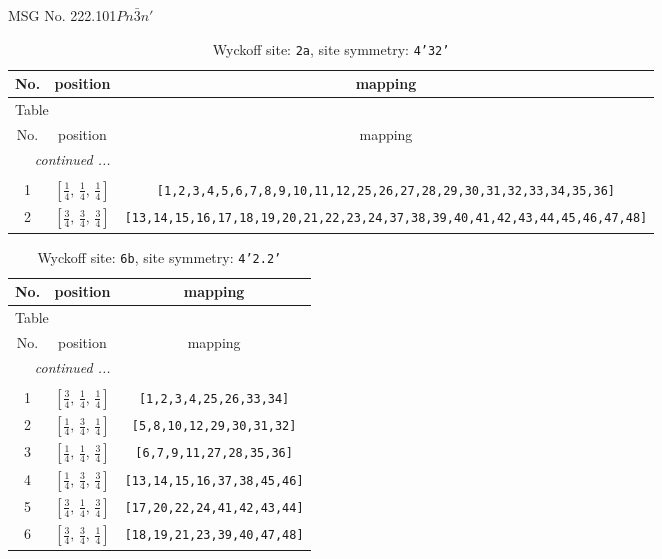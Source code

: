 \documentclass[fleqn,8pt]{jsarticle}
\begin{document}
\setcounter{MaxMatrixCols}{32}

\renewcommand{\tablename}{Table~}
\renewcommand{\figurename}{Figure~}
\begin{center}
\LARGE
MSG No. 222.101\quad$Pn\bar{3}n'$
\end{center}
\renewcommand{\arraystretch}{1.2}
\begin{longtable}{ccc}
\caption{Wyckoff site: {\tt 2a}, site symmetry: {\tt 4'32'}}
 \\
 \hline \hline
No. & position & mapping \\ \hline \endfirsthead

\multicolumn{2}{l}{\tablename\ \thetable{}} \\
 \hline \hline
No. & position & mapping \\ \hline \endhead

 \hline \hline
\multicolumn{2}{r}{\footnotesize\it continued ...} \\ \endfoot

 \hline \hline
\multicolumn{2}{r}{} \\ \endlastfoot

1 & $\left[ \frac{1}{4},\, \frac{1}{4},\, \frac{1}{4} \right]$ & {\tt [1,2,3,4,5,6,7,8,9,10,11,12,25,26,27,28,29,30,31,32,33,34,35,36]} \\ \hline
2 & $\left[ \frac{3}{4},\, \frac{3}{4},\, \frac{3}{4} \right]$ & {\tt [13,14,15,16,17,18,19,20,21,22,23,24,37,38,39,40,41,42,43,44,45,46,47,48]} \\
\end{longtable}
\renewcommand{\arraystretch}{1.2}
\begin{longtable}{ccc}
\caption{Wyckoff site: {\tt 6b}, site symmetry: {\tt 4'2.2'}}
 \\
 \hline \hline
No. & position & mapping \\ \hline \endfirsthead

\multicolumn{2}{l}{\tablename\ \thetable{}} \\
 \hline \hline
No. & position & mapping \\ \hline \endhead

 \hline \hline
\multicolumn{2}{r}{\footnotesize\it continued ...} \\ \endfoot

 \hline \hline
\multicolumn{2}{r}{} \\ \endlastfoot

1 & $\left[ \frac{3}{4},\, \frac{1}{4},\, \frac{1}{4} \right]$ & {\tt [1,2,3,4,25,26,33,34]} \\ \hline
2 & $\left[ \frac{1}{4},\, \frac{3}{4},\, \frac{1}{4} \right]$ & {\tt [5,8,10,12,29,30,31,32]} \\ \hline
3 & $\left[ \frac{1}{4},\, \frac{1}{4},\, \frac{3}{4} \right]$ & {\tt [6,7,9,11,27,28,35,36]} \\ \hline
4 & $\left[ \frac{1}{4},\, \frac{3}{4},\, \frac{3}{4} \right]$ & {\tt [13,14,15,16,37,38,45,46]} \\ \hline
5 & $\left[ \frac{3}{4},\, \frac{1}{4},\, \frac{3}{4} \right]$ & {\tt [17,20,22,24,41,42,43,44]} \\ \hline
6 & $\left[ \frac{3}{4},\, \frac{3}{4},\, \frac{1}{4} \right]$ & {\tt [18,19,21,23,39,40,47,48]} \\
\end{longtable}
\end{document}

